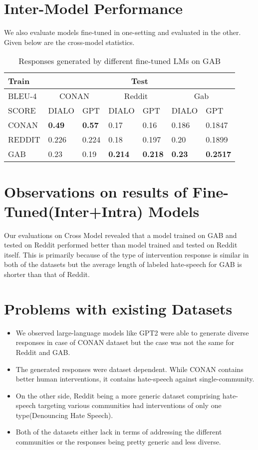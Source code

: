 \section{Inter-Model Performance}

\par We also evaluate models fine-tuned in one-setting and evaluated in the other. Given below are the cross-model statistics.

\begin{table}[h]
\centering
\begin{tabular}{|p{2cm}||p{1.5cm}|p{1.5cm}|p{1.5cm}|p{1.5cm}|p{1.5cm}|p{1.5cm}|}
 \hline
 Train & \multicolumn{6}{|c|}{Test} \\
 \hline
 BLEU-4 & \multicolumn{2}{|c|}{CONAN} & \multicolumn{2}{|c|}{Reddit} & \multicolumn{2}{|c|}{Gab}\\
 SCORE &  DIALO  & GPT & DIALO &  GPT  & DIALO & GPT\\
 \hline
 CONAN &  \textbf{0.49}  & \textbf{0.57} & 0.17 &  0.16  & 0.186 & 0.1847\\
 \hline
 REDDIT & 0.226  & 0.224 & 0.18 &  0.197  & 0.20 & 0.1899\\
 \hline
 GAB &  0.23  & 0.19 & \textbf{0.214} &  \textbf{0.218}  & \textbf{0.23} & \textbf{0.2517}\\
 \hline
\end{tabular}
\caption{Responses generated by different fine-tuned LMs on GAB}
\label{example-7}
\end{table}

\section{Observations on results of Fine-Tuned(Inter+Intra) Models}
\par Our evaluations on Cross Model revealed that a model trained on GAB and tested on Reddit performed better than model trained and tested on Reddit itself. This is primarily because of the type of intervention response is similar in both of the datasets but the average length of labeled hate-speech for GAB is shorter than that of Reddit.

\newpage
\section {Problems with existing Datasets}
\begin{itemize}
    \item We observed large-language models like GPT2 were able to generate diverse responses in case of CONAN dataset but the case was not the same for Reddit and GAB.
    \item The generated responses were dataset dependent. While CONAN contains better human interventions, it contains hate-speech against single-community.
    \item On the other side, Reddit being a more generic dataset comprising hate-speech targeting various communities had interventions of only one type(Denouncing Hate Speech).
    \item Both of the datasets either lack in terms of addressing the different communities or the responses being pretty generic and less diverse.
\end{itemize} 

